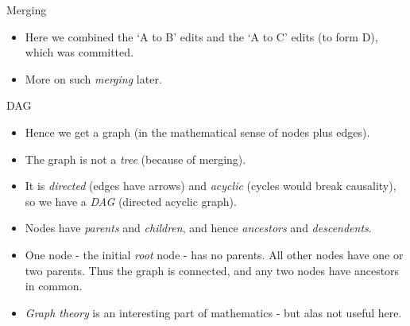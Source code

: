 \documentclass[usenames,dvipsnames]{beamer}
\begin{document}
\begin{frame}{Merging}
  \begin{figure}
    \begin{center}
    \end{center}
  \end{figure}
  \begin{block}{}
    \begin{itemize}
      \item{Here we combined the `A to B' edits and the `A to C' edits (to form D), which was committed.}
      \item{More on such \textit{merging} later.}
    \end{itemize}
  \end{block}
\end{frame}

\begin{frame}{DAG}
  \begin{block}{}
    \begin{itemize}
      \item{Hence we get a graph (in the mathematical sense of nodes plus edges).}
      \item{The graph is not a \textit{tree} (because of merging).}
      \item{It is \textit{directed} (edges have arrows) and \textit{acyclic} (cycles would break causality), so we have a \textit{DAG} (directed acyclic graph).}
      \item{Nodes have \textit{parents} and \textit{children}, and hence \textit{ancestors} and \textit{descendents}.}
      \item{One node - the initial \textit{root} node - has no parents. All other nodes have one or two parents. Thus the graph is connected, and any two nodes have ancestors in common.}
      \item{\textit{Graph theory} is an interesting part of mathematics - but alas not useful here.}
    \end{itemize}
  \end{block}
\end{frame}
\end{document}
